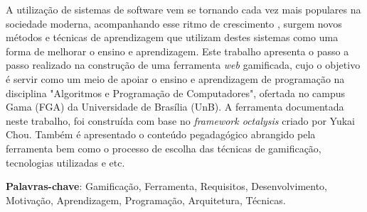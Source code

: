 \begin{resumo}

    A utilização de sistemas de software vem se tornando cada vez mais populares na sociedade moderna, acompanhando esse ritmo de crescimento
    , surgem novos métodos e técnicas de aprendizagem que utilizam destes sistemas como uma forma de melhorar o ensino e aprendizagem. Este trabalho 
    apresenta o passo a passo realizado na construção de uma ferramenta \textit{web} gamificada, cujo o objetivo é servir como um meio
    de apoiar o ensino e aprendizagem de programação na disciplina "Algoritmos e Programação de Computadores", ofertada no campus Gama (FGA) da 
    Universidade de Brasília (UnB). A ferramenta documentada neste trabalho, foi construída com base no \textit{framework octalysis} criado por Yukai Chou. Também é apresentado o conteúdo pegadagógico abrangido pela ferramenta
    bem como o processo de escolha das técnicas de gamificação, tecnologias utilizadas e etc.
    
     \vspace{\onelineskip}
        
     \noindent
     \textbf{Palavras-chave}: Gamificação, Ferramenta, Requisitos, Desenvolvimento, Motivação, Aprendizagem, Programação, Arquitetura, Técnicas.
    \end{resumo}